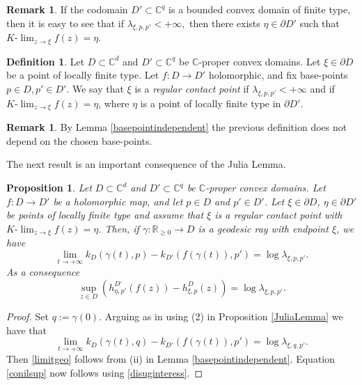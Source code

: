 \documentclass[11pt, reqno]{amsart}
\numberwithin{equation}{section}
\newtheorem{proposition}[theorem]{Proposition}
\theoremstyle{definition}
\newtheorem{remark}[theorem]{Remark}
\newtheorem{definition}[theorem]{Definition}
\newcommand{\C}{\mathbb{C}}
\newcommand{\R}{\mathbb{R}}
\begin{document}
{{{		
		\begin{remark}\label{esisteKlim}
			If the codomain $D'\subset \C^{q}$ is a bounded convex domain of finite type, then it is easy to see that if $\lambda_{\xi,p,p'}<+\infty,$ then there exists $\eta\in \partial D'$ such that    $K\textrm{-}\lim_{z\to\xi}f(z)=\eta$.
			
		\end{remark}
		
		
		\begin{definition}\label{defregcont}
			Let $D\subset\C^d$ and $D'\subset\C^{q}$ be  $\C$-proper convex domains.  Let $\xi\in\partial D$ be a point of locally finite type.  Let $f\colon D\to D'$ holomorphic, and fix base-points $p\in D,p'\in D'$. We say that $\xi$ is a {\sl regular contact point} if $\lambda_{\xi,p,p'}<+\infty$ and if  $K\textrm{-}\lim_{z\to\xi}f(z)=\eta$, where $\eta$ is a point of locally finite type in $\partial D'$.
		\end{definition}
		\begin{remark}\label{dilationcambiopolo}
			By Lemma \ref{basepointindependent} the previous definition does not depend on the chosen base-points.
		\end{remark}
		
		
		
		
		
		
		The next   result  is an important consequence of the Julia Lemma.
		\begin{proposition}\label{prop:JFCGeneral}
			Let $D\subset\C^d$ and $D'\subset\C^{q}$ be  $\C$-proper convex domains.  
			Let $f\colon D\to D'$ be a holomorphic map, and let $p\in D$ and $p'\in D'$.  Let $\xi\in\partial D$, $\eta\in \partial D'$ be   points of locally finite type and assume that $\xi$ is a regular contact point with $K\textrm{-}\lim_{z\to\xi}f(z)=\eta$.
			Then,  if $\gamma\colon\R_{\geq 0}\rightarrow D$ is a geodesic ray with  endpoint $\xi$, we have
			\begin{equation}
				\label{limitgeo}
				\lim_{t\to+\infty} k_D(\gamma(t),p) - k_{D'}(f(\gamma(t)),p') = \log \lambda_{\xi,p,p'}.
			\end{equation} 
			As a consequence
			\begin{equation}\label{conilsup}
				\sup_{z\in D}\left(h^{D'}_{\eta,p'}(f(z))-h^D_{\xi,p}(z)\right)=\log\lambda_{\xi,p,p'}.
			\end{equation}
		\end{proposition}
		\begin{proof}
			Set $q:=\gamma(0)$. Arguing as in 
			\cite[Lemma 3.12]{AFGK} using  (2) in Proposition \ref{JuliaLemma}
			we have that $$\lim_{t\to+\infty} k_D(\gamma(t),q) - k_{D'}(f(\gamma(t)),p') = \log \lambda_{\xi,q,p'}.$$
			Then \eqref{limitgeo} follows from (ii) in Lemma \ref{basepointindependent}.
			Equation \eqref{conilsup} now follows using \eqref{disuginteress}.
		\end{proof}
		
}}}
\end{document}
